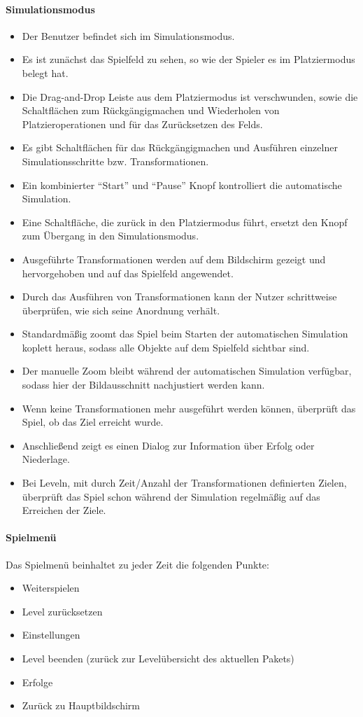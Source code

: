 \paragraph{Simulationsmodus}\mbox{}\newline
\begin{itemize}
\item Der Benutzer befindet sich im Simulationsmodus.
\item Es ist zunächst das Spielfeld zu sehen, so wie der Spieler es im Platziermodus belegt hat.
\item Die Drag-and-Drop Leiste aus dem Platziermodus ist verschwunden, sowie die 
Schaltflächen zum Rückgängigmachen und Wiederholen von 
Platzieroperationen und für das Zurücksetzen des Felds.
\item Es gibt Schaltflächen für das Rückgängigmachen und Ausführen 
einzelner Simulationsschritte bzw. Transformationen.
\item Ein kombinierter ``Start'' und ``Pause'' Knopf kontrolliert die automatische Simulation.
\item Eine Schaltfläche, die zurück in den Platziermodus führt, ersetzt den Knopf zum Übergang 
in den Simulationsmodus.
\item Ausgeführte Transformationen werden auf dem Bildschirm gezeigt und hervorgehoben und auf das Spielfeld angewendet.
\item Durch das Ausführen von Transformationen kann der Nutzer schrittweise
überprüfen, wie sich seine Anordnung verhält.
\item Standardmäßig zoomt das Spiel beim Starten der automatischen Simulation koplett heraus, sodass alle Objekte auf dem Spielfeld sichtbar sind.
\item Der manuelle Zoom bleibt während der automatischen Simulation verfügbar, sodass hier der Bildausschnitt nachjustiert werden kann.
\item Wenn keine Transformationen mehr ausgeführt werden können, überprüft das Spiel, ob das Ziel erreicht
wurde.
\item Anschließend zeigt es einen Dialog zur Information über Erfolg oder Niederlage.
\item Bei Leveln, mit durch Zeit/Anzahl der Transformationen definierten Zielen,
überprüft das Spiel schon während der Simulation regelmäßig auf das Erreichen
der Ziele.
\end{itemize}

\paragraph{Spielmenü}\mbox{}\newline
Das Spielmenü beinhaltet zu jeder Zeit die folgenden Punkte:
\begin{itemize}
	\item Weiterspielen
	\item Level zurücksetzen
	\item Einstellungen
	\item Level beenden (zurück zur Levelübersicht des aktuellen Pakets)
	\item Erfolge
	\item Zurück zu Hauptbildschirm
\end{itemize}
